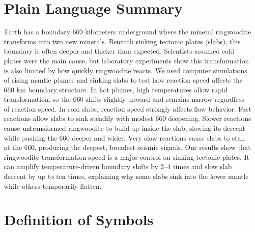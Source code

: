\documentclass[draft,linenumbers]{agujournal2019}
\begin{document}
\section*{Plain Language Summary}
Earth has a boundary 660 kilometers underground where the mineral
ringwoodite transforms into two new minerals. Beneath sinking tectonic
plates (slabs), this boundary is often deeper and thicker than expected.
Scientists assumed cold plates were the main cause, but laboratory
experiments show this transformation is also limited by how quickly
ringwoodite reacts. We used computer simulations of rising mantle plumes
and sinking slabs to test how reaction speed affects the 660 km boundary
structure. In hot plumes, high temperatures allow rapid transformation,
so the 660 shifts slightly upward and remains narrow regardless of
reaction speed. In cold slabs, reaction speed strongly affects flow
behavior. Fast reactions allow slabs to sink steadily with modest 660
deepening. Slower reactions cause untransformed ringwoodite to build up
inside the slab, slowing its descent while pushing the 660 deeper and
wider. Very slow reactions cause slabs to stall at the 660, producing
the deepest, broadest seismic signals. Our results show that ringwoodite
transformation speed is a major control on sinking tectonic plates. It
can amplify temperature-driven boundary shifts by 2--4 times and slow
slab descent by up to ten times, explaining why some slabs sink into the
lower mantle while others temporarily flatten.

\clearpage

\section*{Definition of Symbols}\label{sec:definition-of-symbols}
\end{document}
